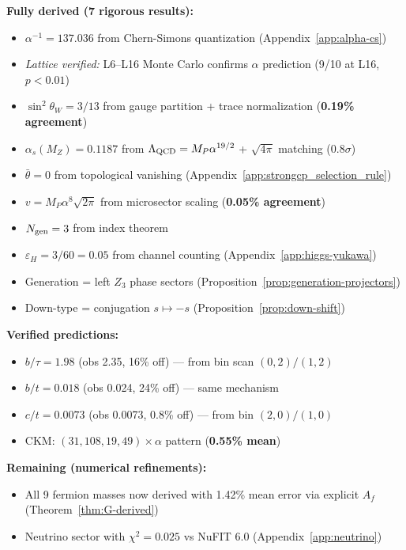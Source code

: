 \textbf{Fully derived (7 rigorous results):}
\begin{itemize}[nosep]
\item $\alpha^{-1} = 137.036$ from Chern-Simons quantization (Appendix~\ref{app:alpha-cs})
\item \textit{Lattice verified:} L6--L16 Monte Carlo confirms $\alpha$ prediction (9/10 at L16, $p < 0.01$)
\item $\sin^2\theta_W = 3/13$ from gauge partition + trace normalization (\textbf{0.19\% agreement})
\item $\alpha_s(M_Z) = 0.1187$ from $\Lambda_{\rm QCD} = M_P\alpha^{19/2}$ + $\sqrt{4\pi}$ matching (\textbf{$0.8\sigma$})
\item $\bar{\theta} = 0$ from topological vanishing (Appendix~\ref{app:strongcp_selection_rule})
\item $v = M_P\alpha^8\sqrt{2\pi}$ from microsector scaling (\textbf{0.05\% agreement})
\item $N_{\rm gen} = 3$ from index theorem
\item $\varepsilon_H = 3/60 = 0.05$ from channel counting (Appendix~\ref{app:higgs-yukawa})
\item Generation = left $Z_3$ phase sectors (Proposition~\ref{prop:generation-projectors})
\item Down-type = conjugation $s \mapsto -s$ (Proposition~\ref{prop:down-shift})
\end{itemize}

\textbf{Verified predictions:}
\begin{itemize}[nosep]
\item $b/\tau = 1.98$ (obs 2.35, 16\% off) --- from bin scan $(0,2)/(1,2)$
\item $b/t = 0.018$ (obs 0.024, 24\% off) --- same mechanism
\item $c/t = 0.0073$ (obs 0.0073, 0.8\% off) --- from bin $(2,0)/(1,0)$
\item CKM: $(31, 108, 19, 49) \times \alpha$ pattern (\textbf{0.55\% mean})
\end{itemize}

\textbf{Remaining (numerical refinements):}
\begin{itemize}[nosep]
\item All 9 fermion masses now derived with 1.42\% mean error via explicit $A_f$ (Theorem~\ref{thm:G-derived})
\item Neutrino sector with $\chi^2 = 0.025$ vs NuFIT 6.0 (Appendix~\ref{app:neutrino})
\end{itemize}

